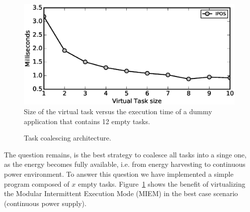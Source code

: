 \begin{figure}
	\centering
	\includegraphics[width=0.8\columnwidth]{figures/virtualTaskSize.eps}
	\caption{Size of the virtual task versus the execution time of a dummy application that contains 12 empty tasks.}
	\label{fig:virtualTaskSize}
\end{figure}

\begin{figure}
	\centering
	\caption{Task coalescing architecture.}
	\label{fig:}
\end{figure}

The question remains, is the best strategy to coalesce all tasks into a singe one, as the energy becomes fully available, i.e. from energy harvesting to continuous power environment. To answer this question we have implemented a simple program composed of $x$ empty tasks.  Figure~\ref{fig:virtualTaskSize} shows the benefit of virtualizing the Modular Intermittent Execution Mode (MIEM) in the best case scenario (continuous power supply). 


%		
%		
